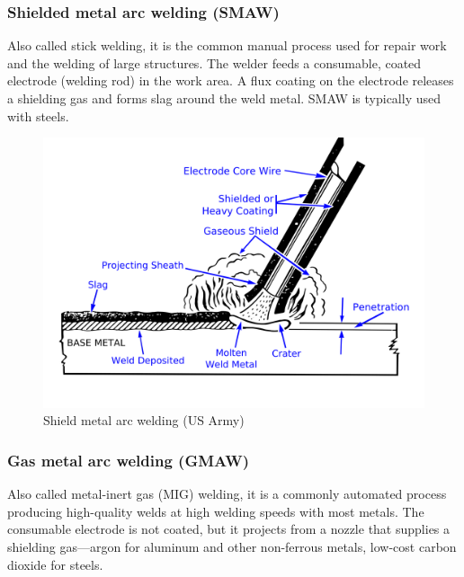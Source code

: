 \documentclass[
10pt,
a4paper,
openany,
svgnames,
]{book}
\begin{document}
\subsubsection{Shielded metal arc welding (SMAW)}

Also called stick welding, it is the common manual process used for repair work and the welding of large structures. The welder feeds a consumable, coated electrode (welding rod) in the work area. A flux coating on the electrode releases a shielding gas and forms slag around the weld metal. SMAW is typically used with steels.

\begin{figure}[h]
  \centering
  \includegraphics[scale=0.12]{pictures/Welding/shield-metal-arc-welding}
  \caption{Shield metal arc welding (US Army)}
\end{figure}
 
\subsubsection{Gas metal arc welding (GMAW)}

Also called metal-inert gas (MIG) welding, it is a commonly automated process producing high-quality welds at high welding speeds with most metals. The consumable electrode is not coated, but it projects from a nozzle that supplies a shielding gas—argon for aluminum and other non-ferrous metals, low-cost carbon dioxide for steels.
\end{document}

